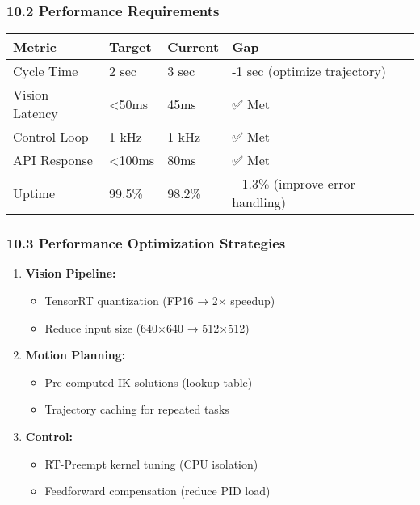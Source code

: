 \documentclass[
]{article}
\providecommand{\tightlist}{%
  \setlength{\itemsep}{0pt}\setlength{\parskip}{0pt}}
\begin{document}
\hypertarget{performance-requirements}{%
\subsubsection{10.2 Performance
Requirements}\label{performance-requirements}}

\begin{longtable}[]{@{}llll@{}}
\toprule\noalign{}
\textbf{Metric} & \textbf{Target} & \textbf{Current} & \textbf{Gap} \\
\midrule\noalign{}
\endhead
\bottomrule\noalign{}
\endlastfoot
Cycle Time & 2 sec & 3 sec & -1 sec (optimize trajectory) \\
Vision Latency & \textless50ms & 45ms & ✅ Met \\
Control Loop & 1 kHz & 1 kHz & ✅ Met \\
API Response & \textless100ms & 80ms & ✅ Met \\
Uptime & 99.5\% & 98.2\% & +1.3\% (improve error handling) \\
\end{longtable}

\hypertarget{performance-optimization-strategies}{%
\subsubsection{10.3 Performance Optimization
Strategies}\label{performance-optimization-strategies}}

\begin{enumerate}
\def\labelenumi{\arabic{enumi}.}
\tightlist
\item
  \textbf{Vision Pipeline:}

  \begin{itemize}
  \tightlist
  \item
    TensorRT quantization (FP16 → 2× speedup)
  \item
    Reduce input size (640×640 → 512×512)
  \end{itemize}
\item
  \textbf{Motion Planning:}

  \begin{itemize}
  \tightlist
  \item
    Pre-computed IK solutions (lookup table)
  \item
    Trajectory caching for repeated tasks
  \end{itemize}
\item
  \textbf{Control:}

  \begin{itemize}
  \tightlist
  \item
    RT-Preempt kernel tuning (CPU isolation)
  \item
    Feedforward compensation (reduce PID load)
  \end{itemize}
\end{enumerate}
\end{document}
